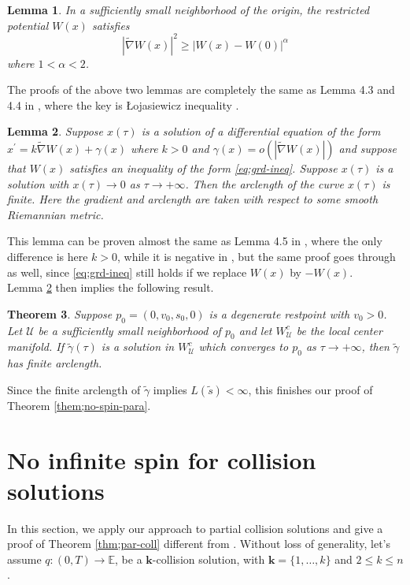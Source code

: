 \documentclass[11pt]{amsart}
\newtheorem{theorem}{Theorem}[section]
\newtheorem{lemma}[theorem]{Lemma}
\theoremstyle{definition}
\theoremstyle{remark}
\numberwithin{equation}{section}
\newcommand{\be}{\mathbb E}
\newcommand{\al}{\alpha}
\newcommand{\gm}{\gamma}
\newcommand{\bk}{\mathbf k}
\begin{document}
\begin{lemma}\label{lem;grd-ineq}
    In a sufficiently small neighborhood of the origin, the restricted potential $W(x)$ satisfies
    \begin{equation}\label{eq;grd-ineq}
        |\tilde{\nabla}W(x)|^2\ge |W(x)-W(0)|^\al
    \end{equation} 
    where $1<\al<2$.
\end{lemma}
The proofs of the above two lemmas are completely the same as Lemma 4.3 and 4.4 in \cite[Section 4]{MM25}, where the key is \L ojasiewicz inequality \cite{Lj82}.
\begin{lemma}\label{lem;grd-flow}
    Suppose $x(\tau)$ is a solution of a differential equation of the form $x^\prime=k\tilde{\nabla}W(x)+\gamma(x)$ where $k>0$ and $\gamma(x)=o(|\tilde{\nabla}W(x)|)$ and suppose that $W(x)$ satisfies an inequality of the form \eqref{eq;grd-ineq}. Suppose $x(\tau)$ is a solution with $x(\tau)\rightarrow0$ as $\tau\rightarrow +\infty$. Then the arclength of the curve $x(\tau)$ is finite. Here the gradient and arclength are taken with respect to some smooth Riemannian metric.
\end{lemma}
This lemma can be proven almost the same as Lemma 4.5 in \cite[Section 4]{MM25}, where the only difference is here $k>0$, while it is negative in \cite{MM25}, but the same proof goes through as well, since \eqref{eq;grd-ineq} still holds if we replace $W(x)$ by $-W(x)$.\\
\indent Lemma \ref{lem;grd-flow} then implies the following result.
 \begin{theorem}
\label{thm;flow-center-mnf}
    Suppose $p_0=(0, v_0, s_0, 0)$ is a degenerate restpoint with $v_0>0$. Let $\mathcal{U}$ be a sufficiently small neighborhood of $p_0$ and let $W_{\mathcal{U}}^c$ be the local center manifold. If $\tilde{\gamma}(\tau)$ is a solution in $W_{\mathcal{U}}^c$ which converges to $p_0$ as $\tau\rightarrow+\infty$, then $\tilde{\gamma}$ has finite arclength.
\end{theorem}
Since the finite arclength of $\tilde \gm$ implies $L(\tilde s)<\infty$, this finishes our proof of Theorem \ref{them;no-spin-para}.



\section{No infinite spin for collision solutions} \label{sec;coll-sol}
In this section, we apply our approach to partial collision solutions and give a proof of Theorem \ref{thm;par-coll} different from \cite{GSZ24}. Without loss of generality, let's assume $q: (0, T) \to \be$, be a $\bk$-collision solution, with $\bk=\{1, \dots, k\}$ and $2 \le k \le n$. 
\end{document}
